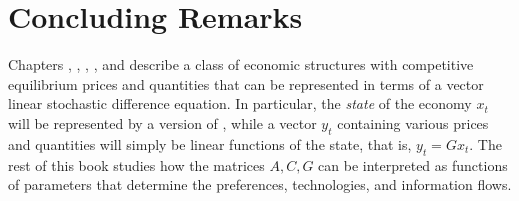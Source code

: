 


\section
{Concluding Remarks}

Chapters , , , , and 
describe a class of economic structures
with competitive equilibrium prices and quantities  that can be
represented in terms of a vector linear stochastic difference equation.
In particular, the {\it state\/} of the economy $x_t$ will be represented by a
version of , while a vector
$y_t$ containing various prices and quantities will simply be linear
functions of the state, that is, $y_t = G x_t$.
The rest of this book studies how the  matrices $A,C,G$ can
be interpreted  as functions of  parameters that determine the
preferences, technologies, and information flows.
%
